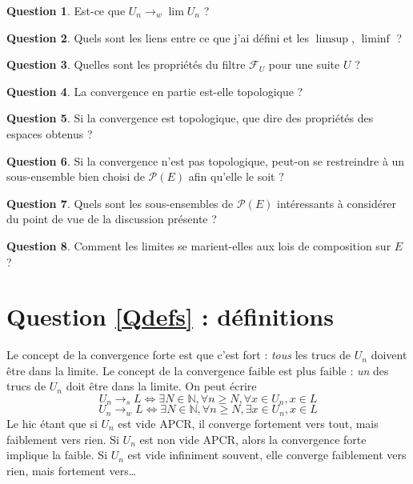 \documentclass{article}
\newcommand{\N}{\mathbb{N}}
\newcommand{\F}{\mathcal{F}}
\renewcommand{\P}{\mathcal{P}}
\theoremstyle{plain}
\theoremstyle{definition}
\newtheorem{question}{Question}
\theoremstyle{remark}
\begin{document}
\begin{question} \label{Qweakconv}
    Est-ce que $U_n \to_w \lim U_n$ ?
\end{question}

\begin{question} \label{Qlimsup}
    Quels sont les liens entre ce que j'ai défini et les $\limsup$, $\liminf$ ?
\end{question}

\begin{question} \label{Qfiltre}
    Quelles sont les propriétés du filtre $\F_U$ pour une suite $U$ ?
\end{question}

\begin{question} \label{Qtopo}
    La convergence en partie est-elle topologique ?
\end{question}

\begin{question}
    Si la convergence est topologique, que dire des propriétés des espaces obtenus ?
\end{question}

\begin{question}
    Si la convergence n'est pas topologique, peut-on se restreindre à un sous-ensemble bien choisi de $\P(E)$ afin qu'elle le soit ?
\end{question}

\begin{question} \label{Qsubsets}
    Quels sont les sous-ensembles de $\P(E)$ intéressants à considérer du point de vue de la discussion présente ?
\end{question}

\begin{question} \label{Qalg}
    Comment les limites se marient-elles aux lois de composition sur $E$ ?
\end{question}

\section{Question \ref{Qdefs} : définitions}

Le concept de la convergence forte est que c'est fort : \emph{tous} les trucs de $U_n$ doivent être dans la limite. Le concept de la convergence faible est plus faible : \emph{un} des trucs de $U_n$ doit être dans la limite. On peut écrire
\[U_n \to_s L \iff \exists N \in \N, \forall n \ge N, \forall x \in U_n, x \in L\]
\[U_n \to_w L \iff \exists N \in \N, \forall n \ge N, \exists x \in U_n, x \in L\]
Le hic étant que si $U_n$ est vide APCR, il converge fortement vers tout, mais faiblement vers rien. Si $U_n$ est non vide APCR, alors la convergence forte implique la faible. Si $U_n$ est vide infiniment souvent, elle converge faiblement vers rien, mais fortement vers\dots
\end{document}
